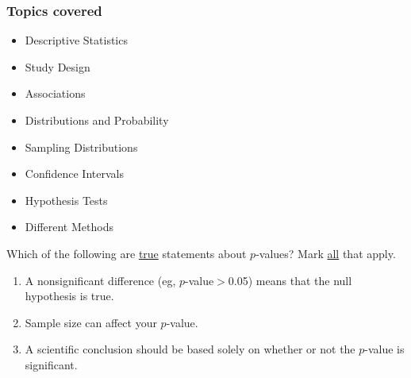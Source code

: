 \begin{frame}[label=topics]
\frametitle{Topics covered }
\begin{itemize}
    \item
    Descriptive Statistics \hyperlink{descriptive}{}
    \item
    Study Design \hyperlink{studydesign}{}
    \item
    Associations \hyperlink{associations}{}
    \item
    Distributions and Probability \hyperlink{probability}{}
    \item
    Sampling Distributions \hyperlink{sampling}{}
    \item
    Confidence Intervals \hyperlink{CIs}{}
    \item
    Hypothesis Tests \hyperlink{tests}{} \hyperlink{errors}{}
    \item
    Different Methods \hyperlink{overview}{} \hyperlink{methods}{} \hyperlink{pvals}{} \end{itemize}
\end{frame}


\begin{frame}
\begin{clicker}{Which of the following are \underline{true} statements about $p$-values?  Mark \underline{all} that apply.}
\begin{enumerate}
    \item
    A nonsignificant difference (eg, $p$-value$>$0.05) means that the null hypothesis is true.
    \item
    Sample size can affect your $p$-value.
    \item
    A scientific conclusion should be based solely on whether or not the $p$-value is significant.
\end{enumerate}
\end{clicker}
\end{frame}



